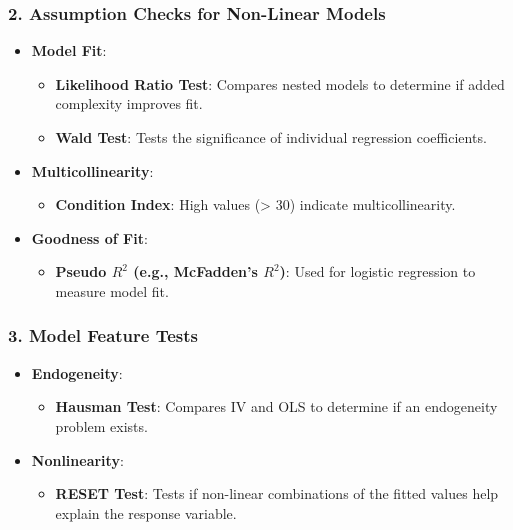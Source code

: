 \documentclass[
]{article}
\providecommand{\tightlist}{%
  \setlength{\itemsep}{0pt}\setlength{\parskip}{0pt}}\usepackage{longtable,booktabs,array}
\begin{document}
\subsubsection{\texorpdfstring{\textbf{2. Assumption Checks for
Non-Linear
Models}}{2. Assumption Checks for Non-Linear Models}}\label{assumption-checks-for-non-linear-models}

\begin{itemize}
\tightlist
\item
  \textbf{Model Fit}:

  \begin{itemize}
  \tightlist
  \item
    \textbf{Likelihood Ratio Test}: Compares nested models to determine
    if added complexity improves fit.
  \item
    \textbf{Wald Test}: Tests the significance of individual regression
    coefficients.
  \end{itemize}
\item
  \textbf{Multicollinearity}:

  \begin{itemize}
  \tightlist
  \item
    \textbf{Condition Index}: High values (\textgreater{} 30) indicate
    multicollinearity.
  \end{itemize}
\item
  \textbf{Goodness of Fit}:

  \begin{itemize}
  \tightlist
  \item
    \textbf{Pseudo \(R^2\) (e.g., McFadden's \(R^2\))}: Used for
    logistic regression to measure model fit.
  \end{itemize}
\end{itemize}

\subsubsection{\texorpdfstring{\textbf{3. Model Feature
Tests}}{3. Model Feature Tests}}\label{model-feature-tests}

\begin{itemize}
\tightlist
\item
  \textbf{Endogeneity}:

  \begin{itemize}
  \tightlist
  \item
    \textbf{Hausman Test}: Compares IV and OLS to determine if an
    endogeneity problem exists.
  \end{itemize}
\item
  \textbf{Nonlinearity}:

  \begin{itemize}
  \tightlist
  \item
    \textbf{RESET Test}: Tests if non-linear combinations of the fitted
    values help explain the response variable.
  \end{itemize}
\end{itemize}
\end{document}
